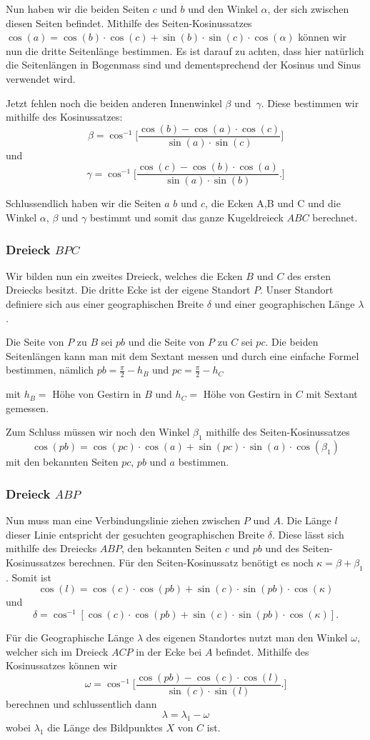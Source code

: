Nun haben wir die beiden Seiten $c$ und $b$ und den Winkel $\alpha$, der sich zwischen diesen Seiten befindet. 
Mithilfe des Seiten-Kosinussatzes 
$\cos(a) = \cos(b)\cdot \cos(c) + \sin(b) \cdot \sin(c)\cdot \cos(\alpha)$ 
können wir nun die dritte Seitenlänge bestimmen. 
Es ist darauf zu achten, dass hier natürlich die Seitenlängen in Bogenmass sind und dementsprechend der Kosinus und Sinus verwendet wird. 

Jetzt fehlen noch die beiden anderen Innenwinkel $\beta$ und\ $\gamma$.
Diese bestimmen wir mithilfe des Kosinussatzes: \[\beta=\cos^{-1}  \bigg[\frac{\cos(b)-\cos(a) \cdot \cos(c)}{\sin(a) \cdot \sin(c)}\bigg]\] und \[\gamma =  \cos^{-1}  \bigg[\frac{\cos(c)-\cos(b) \cdot \cos(a)}{\sin(a) \cdot \sin(b)}.\bigg]\]

Schlussendlich haben wir die Seiten $a$ $b$ und $c$, die Ecken A,B und C und die Winkel $\alpha$, $\beta$  und  $\gamma$ bestimmt und somit das ganze Kugeldreieck $ABC$ berechnet.

\subsubsection{Dreieck $BPC$}
Wir bilden nun ein zweites Dreieck, welches die Ecken $B$ und $C$ des ersten Dreiecks besitzt. 
Die dritte Ecke ist der eigene Standort $P$.
Unser Standort definiere sich aus einer geographischen Breite $\delta$ und einer geographischen Länge $\lambda$. 

Die Seite von $P$ zu $B$ sei $pb$ und die Seite von $P$ zu $C$ sei $pc$.
Die beiden Seitenlängen kann man mit dem Sextant messen und durch eine einfache Formel bestimmen, nämlich $pb=\frac{\pi}{2} - h_{B}$ und $pc=\frac{\pi}{2} - h_{C}$ 

mit $h_B=$ Höhe von Gestirn in $B$ und $h_C=$ Höhe von Gestirn in $C$ mit Sextant gemessen.

Zum Schluss müssen wir noch den Winkel $\beta_1$ mithilfe des Seiten-Kosinussatzes \[\cos(pb)=\cos(pc)\cdot\cos(a)+\sin(pc)\cdot\sin(a)\cdot\cos(\beta_1)\]  mit den bekannten Seiten $pc$, $pb$ und $a$ bestimmen. 
\subsubsection{Dreieck $ABP$}
Nun muss man eine Verbindungslinie ziehen zwischen $P$ und $A$. Die Länge $l$ dieser Linie entspricht der gesuchten geographischen Breite $\delta$. Diese lässt sich mithilfe des Dreiecks $ABP$, den bekannten Seiten $c$ und $pb$ und des Seiten-Kosinussatzes berechnen.
Für den Seiten-Kosinussatz benötigt es noch $\kappa=\beta + \beta_1$.
Somit ist \[\cos(l) = \cos(c)\cdot \cos(pb) + \sin(c) \cdot \sin(pb) \cdot \cos(\kappa)\]
und
\[
\delta  =\cos^{-1} [\cos(c) \cdot \cos(pb) + \sin(c) \cdot \sin(pb) \cdot \cos(\kappa)].
\]

Für die Geographische Länge $\lambda$ des eigenen Standortes nutzt man den Winkel $\omega$, welcher sich im Dreieck $ACP$ in der Ecke bei $A$ befindet. 
Mithilfe des Kosinussatzes können wir \[\omega = \cos^{-1}  \bigg[\frac{\cos(pb)-\cos(c) \cdot \cos(l)}{\sin(c) \cdot \sin(l)}.\bigg]\] berechnen und schlussentlich dann 
\[\lambda=\lambda_1 - \omega\]
wobei $\lambda_1$ die Länge des Bildpunktes $X$ von $C$ ist.
